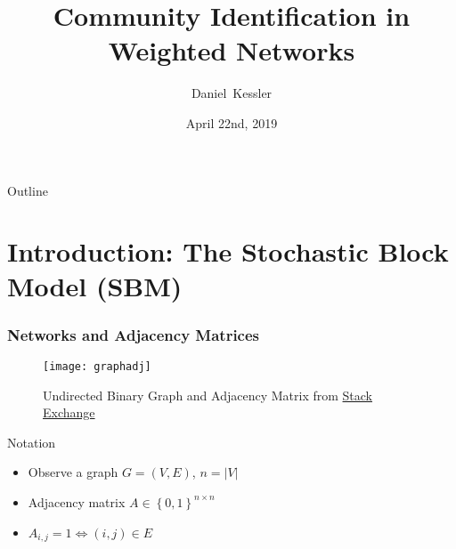 \documentclass{beamer}
\title{Community Identification in Weighted Networks}
\author{Daniel~Kessler}
\institute[kesslerd@umich.edu] %
\date{April 22nd, 2019}
\newcommand{\1}{\mathbbm{1}}
\begin{document}
\maketitle
\begin{frame}{Outline}
  \tableofcontents
\end{frame}



\section{Introduction: The Stochastic Block Model (SBM)}
\label{sec:intr-stoch-block}

\begin{frame}
  \frametitle{Networks and Adjacency Matrices}
  \begin{figure}[h]
    \centering
    \texttt{[image: graphadj]}
    \caption{Undirected Binary Graph and Adjacency Matrix from \href{https://cs.stackexchange.com/questions/71609/adjacency-matrix-and-recognizing-hierarchy}{Stack Exchange}}
    \label{fig:graphadj}
  \end{figure}
  \begin{block}{Notation}
    \begin{itemize}
    \item Observe a graph $G = (V, E)$, $n = \lvert V \rvert$
    \item Adjacency matrix $A \in \left\{ 0, 1 \right\}^{n \times n}$
    \item $A_{i,j} = 1 \iff (i,j) \in E$
    \end{itemize}
  \end{block}
\end{frame}
\end{document}
